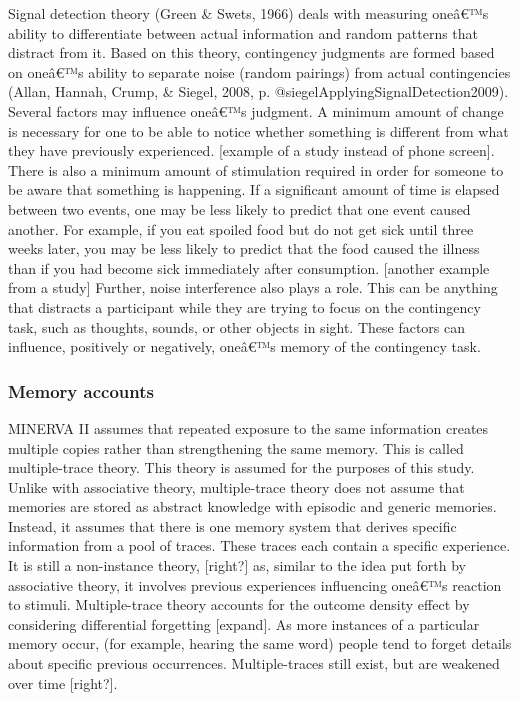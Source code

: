 \documentclass[
  english,
  man,floatsintext]{apa6}
\begin{document}
Signal detection theory (Green \& Swets, 1966) deals with measuring oneâ€™s ability to differentiate between actual information and random patterns that distract from it. Based on this theory, contingency judgments are formed based on oneâ€™s ability to separate noise (random pairings) from actual contingencies (Allan, Hannah, Crump, \& Siegel, 2008, p. @siegelApplyingSignalDetection2009). Several factors may influence oneâ€™s judgment. A minimum amount of change is necessary for one to be able to notice whether something is different from what they have previously experienced. {[}example of a study instead of phone screen{]}. There is also a minimum amount of stimulation required in order for someone to be aware that something is happening. If a significant amount of time is elapsed between two events, one may be less likely to predict that one event caused another. For example, if you eat spoiled food but do not get sick until three weeks later, you may be less likely to predict that the food caused the illness than if you had become sick immediately after consumption. {[}another example from a study{]} Further, noise interference also plays a role. This can be anything that distracts a participant while they are trying to focus on the contingency task, such as thoughts, sounds, or other objects in sight. These factors can influence, positively or negatively, oneâ€™s memory of the contingency task.

\hypertarget{memory-accounts}{%
\subsubsection{Memory accounts}\label{memory-accounts}}

MINERVA II assumes that repeated exposure to the same information creates multiple copies rather than strengthening the same memory. This is called multiple-trace theory. This theory is assumed for the purposes of this study. Unlike with associative theory, multiple-trace theory does not assume that memories are stored as abstract knowledge with episodic and generic memories. Instead, it assumes that there is one memory system that derives specific information from a pool of traces. These traces each contain a specific experience. It is still a non-instance theory, {[}right?{]} as, similar to the idea put forth by associative theory, it involves previous experiences influencing oneâ€™s reaction to stimuli. Multiple-trace theory accounts for the outcome density effect by considering differential forgetting {[}expand{]}. As more instances of a particular memory occur, (for example, hearing the same word) people tend to forget details about specific previous occurrences. Multiple-traces still exist, but are weakened over time {[}right?{]}.
\end{document}
